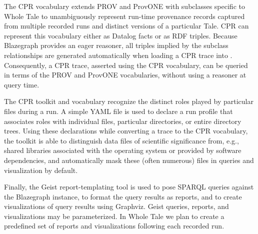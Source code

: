 The CPR vocabulary extends PROV and ProvONE \cite{provone_2015} with subclasses specific to Whole Tale to unambiguously represent run-time provenance records captured from multiple recorded runs and distinct versions of a particular Tale. CPR can represent this vocabulary either as Datalog facts or as RDF triples. Because Blazegraph provides an eager reasoner, all triples implied by the subclass relationships are generated automatically when loading a CPR trace into . Consequently, a CPR trace, asserted using the CPR vocabulary, can be queried in terms of the PROV and ProvONE vocabularies, without using a reasoner at query time.

The CPR toolkit and vocabulary recognize the distinct roles played by particular files during a run. A simple YAML file is used to declare a run profile that associates roles with individual files, particular directories, or entire directory trees. Using these declarations while converting a  trace to the CPR vocabulary, the toolkit is able to distinguish data files of scientific significance from, e.g., shared libraries associated with the operating system or provided by software dependencies, and automatically mask these (often numerous) files in queries and visualization by default.

Finally, the Geist report-templating tool is used to pose SPARQL queries against the Blazegraph instance, to format the query results as reports, and to create visualizations of query results using Graphviz.  Geist queries, reports, and visualizations may be parameterized. In Whole Tale we plan to create a predefined set of reports and visualizations following each recorded run.

